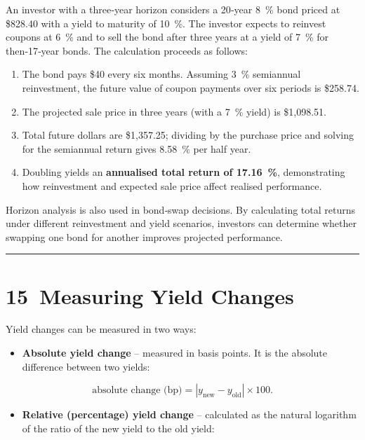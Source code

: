 \documentclass[
  letterpaper,
  DIV=11,
  numbers=noendperiod]{scrartcl}
\providecommand{\tightlist}{%
  \setlength{\itemsep}{0pt}\setlength{\parskip}{0pt}}
\begin{document}
An investor with a three‑year horizon considers a 20‑year 8~\% bond
priced at \$828.40 with a yield to maturity of 10~\%. The investor
expects to reinvest coupons at 6~\% and to sell the bond after three
years at a yield of 7~\% for then‑17‑year bonds. The calculation
proceeds as follows:

\begin{enumerate}
\def\labelenumi{\arabic{enumi}.}
\tightlist
\item
  The bond pays \$40 every six months. Assuming 3~\% semiannual
  reinvestment, the future value of coupon payments over six periods is
  \$258.74.
\item
  The projected sale price in three years (with a 7~\% yield) is
  \$1,098.51.
\item
  Total future dollars are \$1,357.25; dividing by the purchase price
  and solving for the semiannual return gives 8.58~\% per half year.
\item
  Doubling yields an \textbf{annualised total return of 17.16~\%},
  demonstrating how reinvestment and expected sale price affect realised
  performance.
\end{enumerate}

Horizon analysis is also used in bond‑swap decisions. By calculating
total returns under different reinvestment and yield scenarios,
investors can determine whether swapping one bond for another improves
projected performance.

\begin{center}\rule{0.5\linewidth}{0.5pt}\end{center}

\section{15~Measuring Yield Changes}\label{measuring-yield-changes}

Yield changes can be measured in two ways:

\begin{itemize}
\tightlist
\item
  \textbf{Absolute yield change} -- measured in basis points. It is the
  absolute difference between two yields:
\end{itemize}

\[
\text{absolute change (bp)} = |y_{\text{new}} - y_{\text{old}}| \times 100.
\]

\begin{itemize}
\tightlist
\item
  \textbf{Relative (percentage) yield change} -- calculated as the
  natural logarithm of the ratio of the new yield to the old yield:
\end{itemize}
\end{document}
